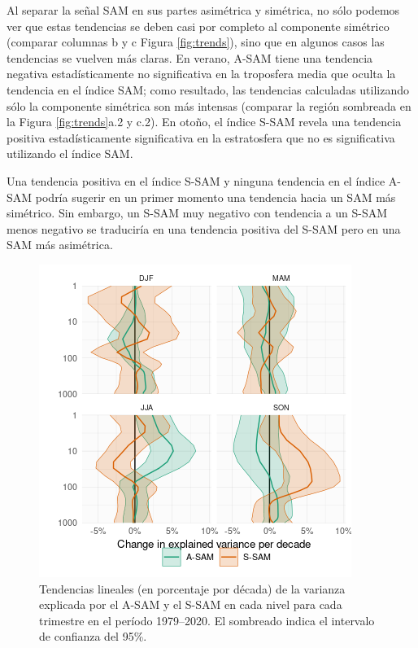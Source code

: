 \documentclass[12pt,oneside]{reedthesis}
\begin{document}
Al separar la señal SAM en sus partes asimétrica y simétrica, no sólo podemos ver que estas tendencias se deben casi por completo al componente simétrico (comparar columnas b y c Figura \ref{fig:trends}), sino que en algunos casos las tendencias se vuelven más claras.
En verano, A-SAM tiene una tendencia negativa estadísticamente no significativa en la troposfera media que oculta la tendencia en el índice SAM; como resultado, las tendencias calculadas utilizando sólo la componente simétrica son más intensas (comparar la región sombreada en la Figura \ref{fig:trends}a.2 y c.2).
En otoño, el índice S-SAM revela una tendencia positiva estadísticamente significativa en la estratosfera que no es significativa utilizando el índice SAM.

Una tendencia positiva en el índice S-SAM y ninguna tendencia en el índice A-SAM podría sugerir en un primer momento una tendencia hacia un SAM más simétrico.
Sin embargo, un S-SAM muy negativo con tendencia a un S-SAM menos negativo se traduciría en una tendencia positiva del S-SAM pero en una SAM más asimétrica.



\begin{figure}
\includegraphics{figures/30-sam/r-squared-trend-1} \caption{Tendencias lineales (en porcentaje por década) de la varianza explicada por el A-SAM y el S-SAM en cada nivel para cada trimestre en el período 1979--2020. El sombreado indica el intervalo de confianza del 95\%.}\label{fig:r-squared-trend}
\end{figure}
\end{document}
